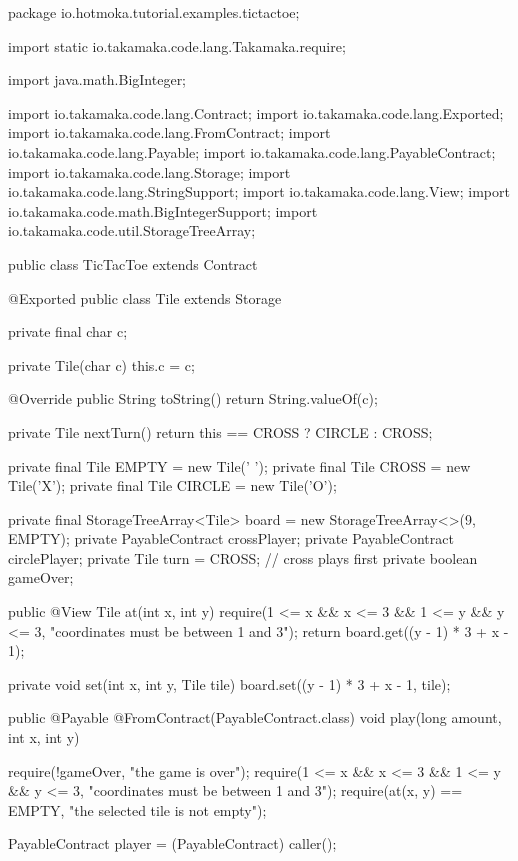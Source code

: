 \begin{codebox}\begin{javalst}
package io.hotmoka.tutorial.examples.tictactoe;

import static io.takamaka.code.lang.Takamaka.require;

import java.math.BigInteger;

import io.takamaka.code.lang.Contract;
import io.takamaka.code.lang.Exported;
import io.takamaka.code.lang.FromContract;
import io.takamaka.code.lang.Payable;
import io.takamaka.code.lang.PayableContract;
import io.takamaka.code.lang.Storage;
import io.takamaka.code.lang.StringSupport;
import io.takamaka.code.lang.View;
import io.takamaka.code.math.BigIntegerSupport;
import io.takamaka.code.util.StorageTreeArray;

public class TicTacToe extends Contract {

  @Exported
  public class Tile extends Storage {
    private final char c;

    private Tile(char c) {
      this.c = c;
    }

    @Override
    public String toString() {
      return String.valueOf(c);
    }

    private Tile nextTurn() {
      return this == CROSS ? CIRCLE : CROSS;
    }
  }

  private final Tile EMPTY = new Tile(' ');
  private final Tile CROSS = new Tile('X');
  private final Tile CIRCLE = new Tile('O');

  private final StorageTreeArray<Tile> board = new StorageTreeArray<>(9, EMPTY);
  private PayableContract crossPlayer;
  private PayableContract circlePlayer;
  private Tile turn = CROSS; // cross plays first
  private boolean gameOver;

  public @View Tile at(int x, int y) {
    require(1 <= x && x <= 3 && 1 <= y && y <= 3, "coordinates must be between 1 and 3");
    return board.get((y - 1) * 3 + x - 1);
  }

  private void set(int x, int y, Tile tile) {
    board.set((y - 1) * 3 + x - 1, tile);
  }

  public @Payable @FromContract(PayableContract.class) void play(long amount, int x, int y) {
    require(!gameOver, "the game is over");
    require(1 <= x && x <= 3 && 1 <= y && y <= 3, "coordinates must be between 1 and 3");
    require(at(x, y) == EMPTY, "the selected tile is not empty");

    PayableContract player = (PayableContract) caller();

}}
\end{javalst}
\end{codebox}
